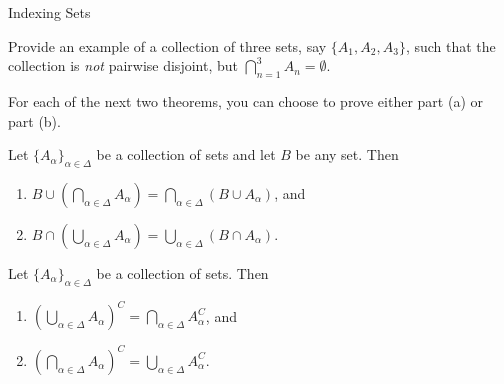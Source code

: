 \begin{section}{Indexing Sets}
\begin{exercise}
Provide an example of a collection of three sets, say $\{A_1, A_2, A_3\}$, such that the collection is \emph{not} pairwise disjoint, but $\bigcap_{n=1}^3 A_n=\emptyset$.
\end{exercise}

For each of the next two theorems, you can choose to prove either part (a) or part (b).

\begin{theorem}
Let $\{A_{\alpha}\}_{\alpha\in\Delta}$ be a collection of sets and let $B$ be any set.  Then
\begin{enumerate}[label=\textrm{(\alph*)}]
\item $\displaystyle B \cup \left(\bigcap_{\alpha\in\Delta}A_{\alpha}\right)=\bigcap_{\alpha\in\Delta}(B\cup A_{\alpha})$, and
\item $\displaystyle B \cap \left(\bigcup_{\alpha\in\Delta}A_{\alpha}\right)=\bigcup_{\alpha\in\Delta}(B\cap A_{\alpha})$.
\end{enumerate}
\end{theorem}

\begin{theorem}
Let $\{A_{\alpha}\}_{\alpha\in\Delta}$ be a collection of sets.  Then
\begin{enumerate}[label=\textrm{(\alph*)}]
\item $\displaystyle \left(\bigcup_{\alpha\in\Delta} A_{\alpha}\right)^C=\bigcap_{\alpha\in\Delta}A_{\alpha}^{C}$, and
\item $\displaystyle \left(\bigcap_{\alpha\in\Delta} A_{\alpha}\right)^C=\bigcup_{\alpha\in\Delta}A_{\alpha}^{C}$.
\end{enumerate}
\end{theorem}

\end{section}